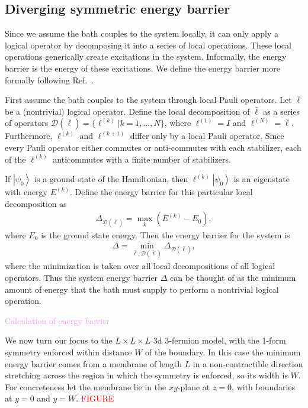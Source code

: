 \documentclass[twocolumn, longbibliography]{revtex4-2}
\newcommand{\note}[1]{\textcolor{red}{#1}}
\newcommand{\outline}[1]{\textcolor{Plum}{#1}}
\renewcommand{\l}{\ell}
\newcommand{\ket}[1]{\left|#1\right\rangle}
\begin{document}
\subsection{Diverging symmetric energy barrier} \label{sub:ener}
	
Since we assume the bath couples to the system locally, it can only apply a logical operator by decomposing it into a series of local operations. These local operations generically create excitations in the system. Informally, the energy barrier is the energy of these excitations. We define the energy barrier more formally following Ref.~\cite{RobertsBartlett}.
	
First assume the bath couples to the system through local Pauli operators. Let $\bar{\l}$ be a (nontrivial) logical operator. Define the local decomposition of $\bar{\l}$ as a series of operators $\mathcal{D}(\bar{\l}) = \{\l^{(k)}| k = 1,\dots,N\}$, where $\l^{(1)}=I$ and $\l^{(N)}=\bar{\l}$. Furthermore, $\l^{(k)}$ and $\l^{(k+1)}$ differ only by a local Pauli operator. Since every Pauli operator either commutes or anti-commutes with each stabilizer, each of the $\l^{(k)}$ anticommutes with a finite number of stabilizers.
	
If $\ket{\psi_0}$ is a ground state of the Hamiltonian, then $\l^{(k)}\ket{\psi_0}$ is an eigenstate with energy $E^{(k)}$. Define the energy barrier for this particular local decomposition as
\begin{align}
\Delta_{\mathcal{D}(\bar{\l})}=\max_k(E^{(k)}-E_0),
\end{align}
where $E_0$ is the ground state energy. Then the energy barrier for the system is
\begin{align}
\Delta = \min_{\bar{\l},\mathcal{D}(\bar{\l})}\Delta_{\mathcal{D}(\bar{\l})},
\end{align}
where the minimization is taken over all local decompositions of all logical operators. Thus the system energy barrier $\Delta$ can be thought of as the minimum amount of energy that the bath must supply to perform a nontrivial logical operation.
	
\outline{Calculation of energy barrier}
	
We now turn our focus to the $L\times L\times L$ 3d 3-fermion model, with the 1-form symmetry enforced within distance $W$ of the boundary. In this case the minimum energy barrier comes from a membrane of length $L$ in a non-contractible direction stretching across the region in which the symmetry is enforced, so its width is $W$. For concreteness let the membrane lie in the $xy$-plane at $z=0$, with boundaries at $y=0$ and $y=W$. \note{FIGURE}
	
\end{document}
